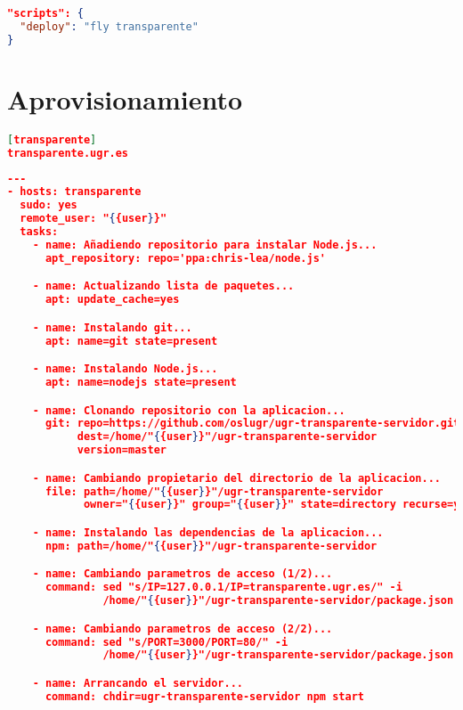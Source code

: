 \begin{lstlisting}[language=json,caption={Scripts de despliegue automático},label={lst:deploy}]
"scripts": {
  "deploy": "fly transparente"
}
\end{lstlisting}

\section{Aprovisionamiento}

\begin{lstlisting}[language=json,caption={Archivo de hosts},label={lst:hosts}]
[transparente]
transparente.ugr.es
\end{lstlisting}

\begin{lstlisting}[language=json,caption={{\tt Playbook} de {\tt Ansible}},label={lst:ansible}]
---
- hosts: transparente
  sudo: yes
  remote_user: "{{user}}"
  tasks:
    - name: Añadiendo repositorio para instalar Node.js...
      apt_repository: repo='ppa:chris-lea/node.js'

    - name: Actualizando lista de paquetes...
      apt: update_cache=yes

    - name: Instalando git...
      apt: name=git state=present

    - name: Instalando Node.js...
      apt: name=nodejs state=present

    - name: Clonando repositorio con la aplicacion...
      git: repo=https://github.com/oslugr/ugr-transparente-servidor.git
           dest=/home/"{{user}}"/ugr-transparente-servidor
           version=master

    - name: Cambiando propietario del directorio de la aplicacion...
      file: path=/home/"{{user}}"/ugr-transparente-servidor
            owner="{{user}}" group="{{user}}" state=directory recurse=yes

    - name: Instalando las dependencias de la aplicacion...
      npm: path=/home/"{{user}}"/ugr-transparente-servidor

    - name: Cambiando parametros de acceso (1/2)...
      command: sed "s/IP=127.0.0.1/IP=transparente.ugr.es/" -i
               /home/"{{user}}"/ugr-transparente-servidor/package.json

    - name: Cambiando parametros de acceso (2/2)...
      command: sed "s/PORT=3000/PORT=80/" -i
               /home/"{{user}}"/ugr-transparente-servidor/package.json

    - name: Arrancando el servidor...
      command: chdir=ugr-transparente-servidor npm start
\end{lstlisting}